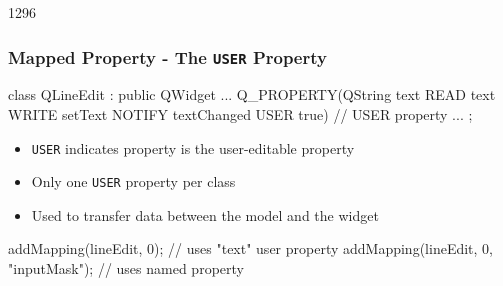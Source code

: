 \begin{slide}[fragile]{1296}\frametitle{Mapped Property - The \texttt{USER} Property}
    \begin{cpp}
class QLineEdit : public QWidget 
{
  ...
  Q_PROPERTY(QString text 
             READ text WRITE setText NOTIFY textChanged 
             USER true) // USER property
  ...
};      
    \end{cpp}
    \begin{itemize}
    \item \texttt{USER} indicates property is the user-editable property
    \item Only one \texttt{USER} property per class
    \item Used to transfer data between the model and the widget
    \end{itemize}
    \begin{cpp}
addMapping(lineEdit, 0); // uses "text" user property
addMapping(lineEdit, 0, "inputMask"); // uses named property      
    \end{cpp}
\end{slide}


